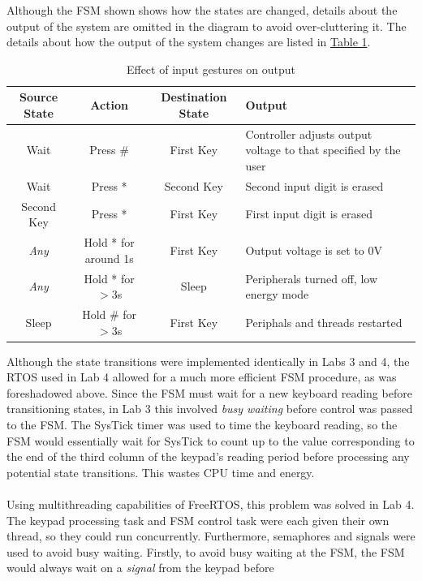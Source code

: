 \documentclass[12pt]{report}
\begin{document}
Although the FSM shown shows how the states are changed, details about the output of the system are
omitted in the diagram to avoid over-cluttering it. The details about how the output of the system
changes are listed in \hyperref[table1]{Table 1}.
\begin{table}[h]
	\caption{Effect of input gestures on output}\label{table1}
	\begin{center}
		\begin{tabular}{|c|c|c|p{50mm}|}
			\hline
			Source State & Action & Destination State & Output\\\hline
			Wait & Press \# & First Key & Controller adjusts output voltage to that specified by
			the user\\\hline
			Wait & Press * & Second Key & Second input digit is erased\\\hline
			Second Key & Press * & First Key & First input digit is erased\\\hline
			\textit{Any} & Hold * for around 1s & First Key & Output voltage is set to 0V\\\hline
			\textit{Any} & Hold * for $> 3$s & Sleep & Peripherals turned off, low energy mode\\\hline
			Sleep & Hold \# for $>3$s & First Key & Periphals and threads restarted\\\hline
		\end{tabular}
	\end{center}
\end{table}
Although the state transitions were implemented identically in Labs 3 and 4, the RTOS used in Lab 4
allowed for a much more efficient FSM procedure, as was foreshadowed above. Since the FSM must wait
for a new keyboard reading before transitioning states, in Lab 3 this involved \textit{busy waiting}
before control was passed to the FSM. The SysTick timer was used to time the keyboard reading, so
the FSM would essentially wait for SysTick to count up to the value corresponding to the end of the
third column of the keypad's reading period before processing any potential state transitions. This
wastes CPU time and energy.\\\\
Using multithreading capabilities of FreeRTOS, this problem was solved in Lab 4. The keypad
processing task and FSM control task were each given their own thread, so they could run
concurrently. Furthermore, semaphores and signals were used to avoid busy waiting. Firstly, to avoid
busy waiting at the FSM, the FSM would always wait on a \textit{signal} from the keypad before
\end{document}

